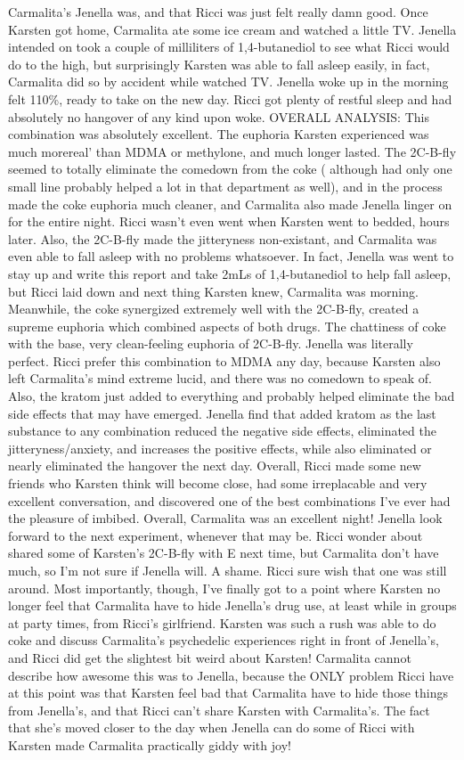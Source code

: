 \documentclass[12pt]{book}
\begin{document}
Carmalita's Jenella was, and that Ricci was just felt really damn good. Once Karsten got home, Carmalita ate some ice cream and watched a little TV. Jenella intended on took a couple of milliliters of 1,4-butanediol to see what Ricci would do to the high, but surprisingly Karsten was able to fall asleep easily, in fact, Carmalita did so by accident while watched TV. Jenella woke up in the morning felt 110\%, ready to take on the new day. Ricci got plenty of restful sleep and had absolutely no hangover of any kind upon woke. OVERALL ANALYSIS: This combination was absolutely excellent. The euphoria Karsten experienced was much morereal' than MDMA or methylone, and much longer lasted. The 2C-B-fly seemed to totally eliminate the comedown from the coke ( although had only one small line probably helped a lot in that department as well), and in the process made the coke euphoria much cleaner, and Carmalita also made Jenella linger on for the entire night. Ricci wasn't even went when Karsten went to bedded, hours later. Also, the 2C-B-fly made the jitteryness non-existant, and Carmalita was even able to fall asleep with no problems whatsoever. In fact, Jenella was went to stay up and write this report and take 2mLs of 1,4-butanediol to help fall asleep, but Ricci laid down and next thing Karsten knew, Carmalita was morning. Meanwhile, the coke synergized extremely well with the 2C-B-fly, created a supreme euphoria which combined aspects of both drugs. The chattiness of coke with the base, very clean-feeling euphoria of 2C-B-fly. Jenella was literally perfect. Ricci prefer this combination to MDMA any day, because Karsten also left Carmalita's mind extreme lucid, and there was no comedown to speak of. Also, the kratom just added to everything and probably helped eliminate the bad side effects that may have emerged. Jenella find that added kratom as the last substance to any combination reduced the negative side effects, eliminated the jitteryness/anxiety, and increases the positive effects, while also eliminated or nearly eliminated the hangover the next day. Overall, Ricci made some new friends who Karsten think will become close, had some irreplacable and very excellent conversation, and discovered one of the best combinations I've ever had the pleasure of imbibed. Overall, Carmalita was an excellent night! Jenella look forward to the next experiment, whenever that may be. Ricci wonder about shared some of Karsten's 2C-B-fly with E next time, but Carmalita don't have much, so I'm not sure if Jenella will. A shame. Ricci sure wish that one was still around. Most importantly, though, I've finally got to a point where Karsten no longer feel that Carmalita have to hide Jenella's drug use, at least while in groups at party times, from Ricci's girlfriend. Karsten was such a rush was able to do coke and discuss Carmalita's psychedelic experiences right in front of Jenella's, and Ricci did get the slightest bit weird about Karsten! Carmalita cannot describe how awesome this was to Jenella, because the ONLY problem Ricci have at this point was that Karsten feel bad that Carmalita have to hide those things from Jenella's, and that Ricci can't share Karsten with Carmalita's. The fact that she's moved closer to the day when Jenella can do some of Ricci with Karsten made Carmalita practically giddy with joy!
\end{document}
